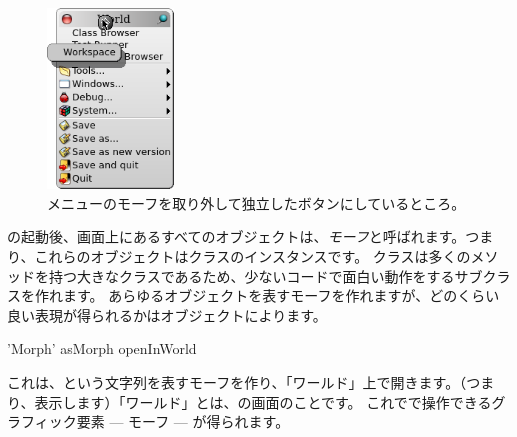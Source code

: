 \documentclass[a4paper,10pt,twoside]{book}
\begin{document}

\begin{figure}[ht]
	\centerline{\includegraphics[width=0.3\textwidth]{detachingMenu}}
	\caption{メニューのモーフを取り外して独立したボタンにしているところ。
		}
\end{figure}

\pharo の起動後、画面上にあるすべてのオブジェクトは、\emph{モーフ}と呼ばれます。つまり、これらのオブジェクトはクラスのインスタンスです。
\mbox{}クラスは多くのメソッドを持つ大きなクラスであるため、少ないコードで面白い動作をするサブクラスを作れます。
あらゆるオブジェクトを表すモーフを作れますが、どのくらい良い表現が得られるかはオブジェクトによります。

\begin{code}{}
'Morph' asMorph openInWorld
\end{code}


これは、という文字列を表すモーフを作り、「ワールド」上で開きます。（つまり、表示します）「ワールド」とは、\pharo の画面のことです。
これで\metaclick で操作できるグラフィック要素 — モーフ — が得られます。
\end{document}

